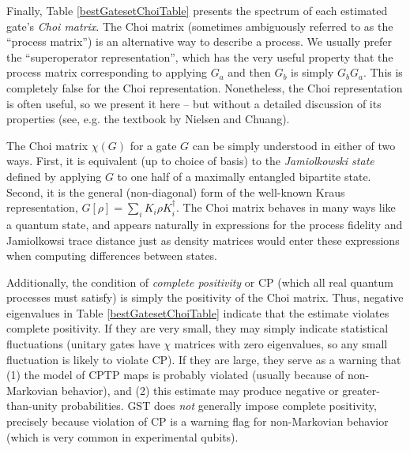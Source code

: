 \documentclass{article}[11pt]
\begin{document}
Finally, Table \ref{bestGatesetChoiTable} presents the spectrum of each estimated gate's \emph{Choi matrix}.  The Choi matrix (sometimes ambiguously referred to as the ``process matrix'') is an alternative way to describe a process.  We usually prefer the ``superoperator representation'', which has the very useful property that the process matrix corresponding to applying $G_a$ and then $G_b$ is simply $G_bG_a$.  This is completely false for the Choi representation.  Nonetheless, the Choi representation is often useful, so we present it here -- but without a detailed discussion of its properties (see, e.g. the textbook by Nielsen and Chuang).

The Choi matrix $\chi(G)$ for a gate $G$ can be simply understood in either of two ways.  First, it is equivalent (up to choice of basis) to the \emph{Jamiolkowski state} defined by applying $G$ to one half of a maximally entangled bipartite state.  Second, it is the general (non-diagonal) form of the well-known Kraus representation, $G[\rho] = \sum_i{K_i\rho K_i^\dagger}$.  The Choi matrix behaves in many ways like a quantum state, and appears naturally in expressions for the process fidelity and Jamiolkowsi trace distance just as density matrices would enter these expressions when computing differences between states.  

Additionally, the condition of \emph{complete positivity} or CP (which all real quantum processes must satisfy) is simply the positivity of the Choi matrix.  Thus, negative eigenvalues in Table \ref{bestGatesetChoiTable} indicate that the estimate violates complete positivity.  If they are very small, they may simply indicate statistical fluctuations (unitary gates have $\chi$ matrices with zero eigenvalues, so any small fluctuation is likely to violate CP).  If they are large, they serve as a warning that (1) the model of CPTP maps is probably violated (usually because of non-Markovian behavior), and (2) this estimate may produce negative or greater-than-unity probabilities.  GST does \emph{not} generally impose complete positivity, precisely because violation of CP is a warning flag for non-Markovian behavior (which is very common in experimental qubits).
\end{document}
